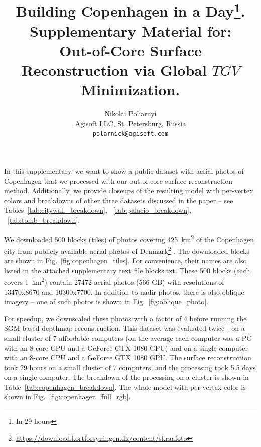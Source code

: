 \documentclass[10pt,letterpaper]{article}
\begin{document}
\title{Building Copenhagen in a Day\footnote{In 29 hours}.
\\ Supplementary Material for: \\ Out-of-Core Surface Reconstruction via Global $TGV$ Minimization.} %

\author{Nikolai Poliarnyi\\
    Agisoft LLC, St. Petersburg, Russia\\
    {\tt\small polarnick@agisoft.com}
}

\maketitle

In this supplementary, we want to show a public dataset with aerial photos of Copenhagen that we processed with our out-of-core surface reconstruction method.
Additionally, we provide closeups of the resulting model with per-vertex colors and breakdowns of other three datasets discussed in the paper -- see Tables~\ref{tab:citywall_breakdown}, ~\ref{tab:palacio_breakdown}, ~\ref{tab:tomb_breakdown}.

We downloaded 500 blocks (tiles) of photos covering \SI{425}{\km\squared} of the Copenhagen city from publicly available aerial photos of Denmark\footnote{\url{https://download.kortforsyningen.dk/content/skraafoto}} \cite{skraafoto_copenhagen}.
The downloaded blocks are shown in Fig.~\ref{fig:copenhagen_tiles}. For convenience, their names are also listed in the attached supplementary text file blocks.txt.
These 500 blocks (each covers \SI{1}{\km\squared}) contain 27472 aerial photos (566 GB) with resolutions of 13470x8670 and 10300x7700.
In addition to nadir photos, there is also oblique imagery -- one of such photos is shown in Fig.~\ref{fig:oblique_photo}.

For speedup, we downscaled these photos with a factor of 4 before running the SGM-based \cite{hirschmuller2007stereo} depthmap reconstruction.
This dataset was evaluated twice - on a small cluster of 7 affordable computers (on the average each computer was a PC with an 8-core CPU and a GeForce GTX 1080 GPU)
and on a single computer with an 8-core CPU and a GeForce GTX 1080 GPU.
The surface reconstruction took 29 hours on a small cluster of 7 computers, and the processing took 5.5 days on a single computer.
The breakdown of the processing on a cluster is shown in Table~\ref{tab:copenhagen_breakdown}.
The whole model with per-vertex color is shown in Fig.~\ref{fig:copenhagen_full_rgb}.
\end{document}
